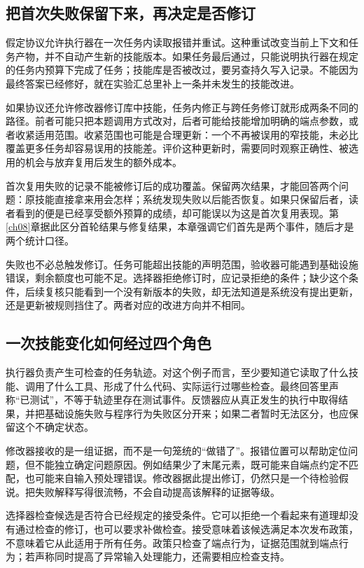 \subsection{把首次失败保留下来，再决定是否修订}

假定协议允许执行器在一次任务内读取报错并重试。这种重试改变当前上下文和任务产物，并不自动产生新的技能版本。如果任务最后通过，只能说明执行器在规定的任务内预算下完成了任务；技能库是否被改过，要另查持久写入记录。不能因为最终答案已经修好，就在实验汇总里补上一条并未发生的技能改进。

如果协议还允许修改器修订库中技能，任务内修正与跨任务修订就形成两条不同的路径。前者可能只把本题调用方式改对，后者可能给技能增加明确的端点参数，或者收紧适用范围。收紧范围也可能是合理更新：一个不再被误用的窄技能，未必比覆盖更多任务却容易误用的技能差。评价这种更新时，需要同时观察正确性、被选用的机会与放弃复用后发生的额外成本。

首次复用失败的记录不能被修订后的成功覆盖。保留两次结果，才能回答两个问题：原技能直接拿来用会怎样；系统发现失败以后能否恢复。如果只保留后者，读者看到的便是已经享受额外预算的成绩，却可能误以为这是首次复用表现。第\ref{ch08}章据此区分首轮结果与修复结果，本章强调它们首先是两个事件，随后才是两个统计口径。

失败也不必总触发修订。任务可能超出技能的声明范围，验收器可能遇到基础设施错误，剩余额度也可能不足。选择器拒绝修订时，应记录拒绝的条件；缺少这个条件，后续复核只能看到一个没有新版本的失败，却无法知道是系统没有提出更新，还是更新被规则挡住了。两者对应的改进方向并不相同。

\subsection{一次技能变化如何经过四个角色}

执行器负责产生可检查的任务轨迹。对这个例子而言，至少要知道它读取了什么技能、调用了什么工具、形成了什么代码、实际运行过哪些检查。最终回答里声称“已测试”，不等于轨迹里存在测试事件。反馈器应从真正发生的执行中取得结果，并把基础设施失败与程序行为失败区分开来；如果二者暂时无法区分，也应保留这个不确定状态。

修改器接收的是一组证据，而不是一句笼统的“做错了”。报错位置可以帮助定位问题，但不能独立确定问题原因。例如结果少了末尾元素，既可能来自端点约定不匹配，也可能来自输入预处理错误。修改器据此提出修订，仍然只是一个待检验假说。把失败解释写得很流畅，不会自动提高该解释的证据等级。

选择器检查候选是否符合已经规定的接受条件。它可以拒绝一个看起来有道理却没有通过检查的修订，也可以要求补做检查。接受意味着该候选满足本次发布政策，不意味着它从此适用于所有任务。政策只检查了端点行为，证据范围就到端点行为；若声称同时提高了异常输入处理能力，还需要相应检查支持。

